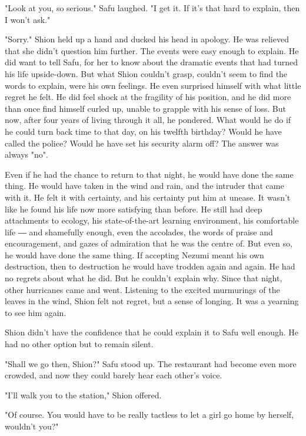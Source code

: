 \myspace

"Look at you, so serious." Safu laughed. "I get it. If it's that hard to
explain, then I won't ask."

"Sorry." Shion held up a hand and ducked his head in apology. He was
relieved that she didn't question him further. The events were easy
enough to explain. He did want to tell Safu, for her to know about the
dramatic events that had turned his life upside-down. But what Shion
couldn't grasp, couldn't seem to find the words to explain, were his own
feelings. He even surprised himself with what little regret he felt. He
did feel shock at the fragility of his position, and he did more than
once find himself curled up, unable to grapple with his sense of loss.
But now, after four years of living through it all, he pondered. What
would he do if he could turn back time to that day, on his twelfth
birthday? Would he have called the police? Would he have set his
security alarm off? The answer was always "no".~

Even if he had the chance to return to that night, he would have done
the same thing. He would have taken in the wind and rain, and the
intruder that came with it. He felt it with certainty, and his certainty
put him at unease. It wasn't like he found his life now more satisfying
than before. He still had deep attachments to ecology, his
state-of-the-art learning environment, his comfortable life ― and
shamefully enough, even the accolades, the words of praise and
encouragement, and gazes of admiration that he was the centre of. But
even so, he would have done the same thing. If accepting Nezumi meant
his own destruction, then to destruction he would have trodden again and
again. He had no regrets about what he did. But he couldn't explain why.
Since that night, other hurricanes came and went. Listening to the
excited murmurings of the leaves in the wind, Shion felt not regret, but
a sense of longing. It was a yearning to see him again.

Shion didn't have the confidence that he could explain it to Safu well
enough. He had no other option but to remain silent.

"Shall we go then, Shion?" Safu stood up. The restaurant had become even
more crowded, and now they could barely hear each other's voice.

"I'll walk you to the station," Shion offered.

"Of course. You would have to be really tactless to let a girl go home
by herself, wouldn't you?"

